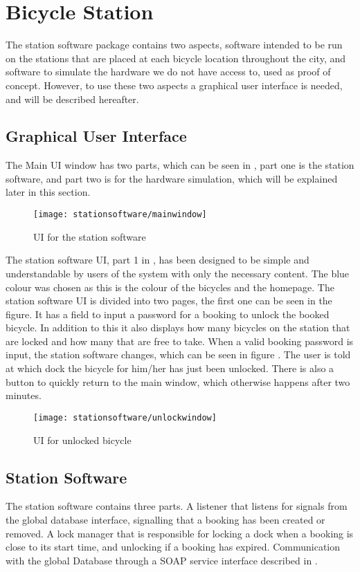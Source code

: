 \section{Bicycle Station}
The station software package contains two aspects, software intended to be run on the stations that are placed at each bicycle location throughout the city, and software to simulate the hardware we do not have access to, used as proof of concept. 
However, to use these two aspects a graphical user interface is needed, and will be described hereafter.

\subsection{Graphical User Interface}
The Main UI window has two parts, which can be seen in , part one is the station software, and part two is for the hardware simulation, which will be explained later in this section.

\begin{figure}[h]
	\centering
	\texttt{[image: stationsoftware/mainwindow]}
	\caption{UI for the station software}\label{fig:stationMain}
\end{figure}

The station software UI, part 1 in , has been designed to be simple and understandable by users of the system with only the necessary content.
The blue colour was chosen as this is the colour of the bicycles and the \bycykel homepage.
The station software UI is divided into two pages, the first one can be seen in the figure.
It has a field to input a password for a booking to unlock the booked bicycle.
In addition to this it also displays how many bicycles on the station that are locked and how many that are free to take.
When a valid booking password is input, the station software changes, which can be seen in figure .
The user is told at which dock the bicycle for him/her has just been unlocked.
There is also a button to quickly return to the main window, which otherwise happens after two minutes.

\begin{figure}[h]
	\centering
	\texttt{[image: stationsoftware/unlockwindow]}
	\caption{UI for unlocked bicycle}\label{fig:bicycleUnlock}
\end{figure}


\subsection{Station Software}
The station software contains three parts.
A listener that listens for signals from the global database interface, signalling that a booking has been created or removed.
A lock manager that is responsible for locking a dock when a booking is close to its start time, and unlocking if a booking has expired.
Communication with the global Database through a SOAP service interface described in .

